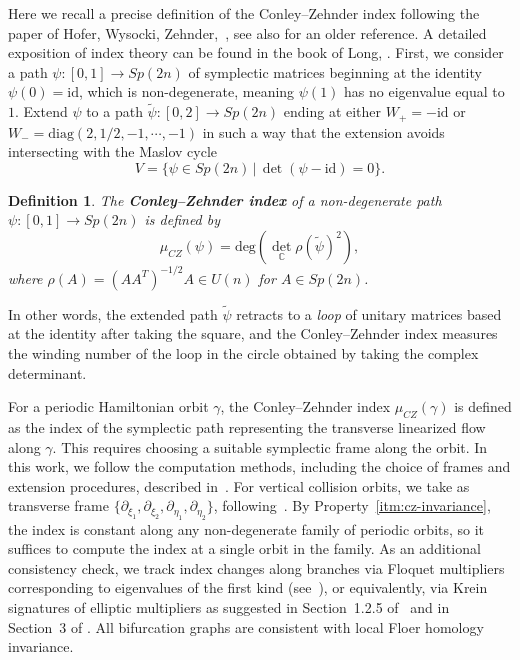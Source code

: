 \documentclass[pdflatex,sn-mathphys-ay]{sn-jnl}%
\theoremstyle{thmstyleone}%
\theoremstyle{thmstyletwo}%
\theoremstyle{thmstylethree}%
\newtheorem{definition}{Definition}%
\newcommand{\id}{\mathrm{id}}
\begin{document}
Here we recall a precise definition of the Conley--Zehnder index following the paper of Hofer, Wysocki, Zehnder,~\cite{HWZ_propertiesII_CZ}, see also \cite{salamon_zehnder_1992} for an older reference. A detailed exposition of index theory can be found in the book of Long, \cite{yiming_long_2002}.
First, we consider a path $\psi: [0,1] \to Sp(2n)$ of symplectic matrices beginning at the identity $\psi(0) = \id$, which is non-degenerate, meaning $\psi(1)$ has no eigenvalue equal to $1$. Extend $\psi$ to a path $\tilde{\psi}: [0,2]\to Sp(2n)$ ending at either $W_+=-\text{id}$ or $W_- = \text{diag}(2, 1/2, -1, \cdots, -1)$ in such a way that the extension avoids intersecting with the Maslov cycle
\[V = \{\psi\in Sp(2n) \,|\, \det (\psi - \text{id}) = 0\}.\]
\begin{definition}
The \textbf{Conley--Zehnder index} of a non-degenerate path $\psi: [0,1] \to Sp(2n)$ is defined by
\[ \mu_{CZ}(\psi) = \text{deg}\left(
    \det_{\mathbb{C}}\rho(\tilde{\psi})^2    
\right), \]
where $\rho(A)=(A A^T)^{-1/2} A\in U(n)$ for $A\in Sp(2n)$.
\end{definition}
In other words, the extended path $\tilde{\psi}$ retracts to a \emph{loop} of unitary matrices based at the identity after taking the square, and the Conley--Zehnder index measures the winding number of the loop in the circle obtained by taking the complex determinant. 

For a periodic Hamiltonian orbit $\gamma$, the Conley--Zehnder index $\mu_{CZ}(\gamma)$ is defined as the index of the symplectic path representing the transverse linearized flow along $\gamma$. 
This requires choosing a suitable symplectic frame along the orbit. In this work, we follow the computation methods, including the choice of frames and extension procedures, described in~\cite{moreno_aydin_van_Koert_Frauenfelder_Koh_Bifurcation_Graphs_2024}. For vertical collision orbits, we take as transverse frame $\{\partial_{\xi_1},\partial_{\xi_2},\partial_{\eta_1},\partial_{\eta_2}\}$, following~\cite{lee_conley-zehnder_2026}. By Property~\ref{itm:cz-invariance}, the index is constant along any non-degenerate family of periodic orbits, so it suffices to compute the index at a single orbit in the family. 
As an additional consistency check, we track index changes along branches via Floquet multipliers corresponding to eigenvalues of the first kind (see~\cite[Theorem 3.1]{salamon_zehnder_1992}), or equivalently, via Krein signatures of elliptic multipliers as suggested in Section~1.2.5 of~\cite{aydin_cz_indices_2023} and in Section~3 of \cite{aydin_Batkhin_hill_2025}. All bifurcation graphs are consistent with local Floer homology invariance.
\end{document}
